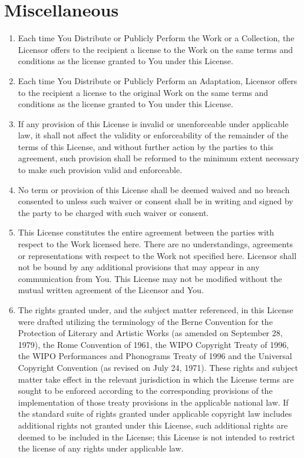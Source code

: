 \section{Miscellaneous}

\begin{enumerate}
\item Each time You Distribute or Publicly Perform the Work
  or a Collection, the Licensor offers to the recipient a
  license to the Work on the same terms and conditions as
  the license granted to You under this License.

\item Each time You Distribute or Publicly Perform an
  Adaptation, Licensor offers to the recipient a license to
  the original Work on the same terms and conditions as the
  license granted to You under this License.

\item If any provision of this License is invalid or
  unenforceable under applicable law, it shall not affect
  the validity or enforceability of the remainder of the
  terms of this License, and without further action by the
  parties to this agreement, such provision shall be
  reformed to the minimum extent necessary to make such
  provision valid and enforceable.

\item No term or provision of this License shall be deemed
  waived and no breach consented to unless such waiver or
  consent shall be in writing and signed by the party to be
  charged with such waiver or consent.

\item This License constitutes the entire agreement between
  the parties with respect to the Work licensed here. There
  are no understandings, agreements or representations with
  respect to the Work not specified here. Licensor shall
  not be bound by any additional provisions that may appear
  in any communication from You. This License may not be
  modified without the mutual written agreement of the
  Licensor and You.

\item The rights granted under, and the subject matter
  referenced, in this License were drafted utilizing the
  terminology of the Berne Convention for the Protection of
  Literary and Artistic Works (as amended on September 28,
  1979), the Rome Convention of 1961, the WIPO Copyright
  Treaty of 1996, the WIPO Performances and Phonograms
  Treaty of 1996 and the Universal Copyright Convention (as
  revised on July 24, 1971). These rights and subject
  matter take effect in the relevant jurisdiction in which
  the License terms are sought to be enforced according to
  the corresponding provisions of the implementation of
  those treaty provisions in the applicable national law.
  If the standard suite of rights granted under applicable
  copyright law includes additional rights not granted
  under this License, such additional rights are deemed to
  be included in the License; this License is not intended
  to restrict the license of any rights under applicable
  law.
\end{enumerate}

